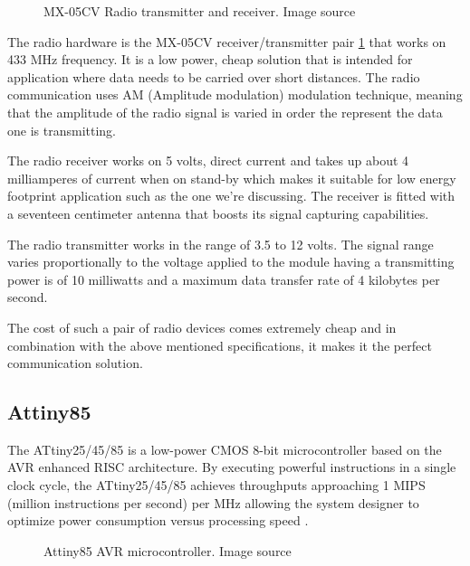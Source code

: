 \begin{figure}[h!]
    \label{fig:rf_tx_rx}
    \centerline{}
    \caption[MX-05CV Radio transmitter and receiver]{MX-05CV Radio transmitter and receiver. Image source
                                                     \cite{website:rf_tx_rx_img}}
    \label{fig:rf_tx_rx}
\end{figure}

\qquad The radio hardware is the MX-05CV receiver/transmitter pair \ref{fig:rf_tx_rx} that works on 433 MHz
frequency. It is a low power, cheap solution that is intended for application where data needs to be carried
over short distances. The radio communication uses AM (Amplitude modulation) modulation technique, meaning
that the amplitude of the radio signal is varied in order the represent the data one is transmitting.

\qquad The radio receiver works on 5 volts, direct current and takes up about 4 milliamperes of current when on stand-by
which makes it suitable for low energy footprint application such as the one we're discussing. The receiver is
fitted with a seventeen centimeter antenna that boosts its signal capturing capabilities.

\qquad The radio transmitter works in the range of 3.5 to 12 volts. The signal range  varies proportionally to the
voltage applied to the module having a transmitting power is of 10 milliwatts and a maximum data transfer rate
of 4 kilobytes per second.

The cost of such a pair of radio devices comes extremely cheap and in combination with the above mentioned
specifications, it makes it the perfect communication solution.

\subsection{Attiny85}
\label{sec:attiny85}

\qquad The ATtiny25/45/85 is a low-power CMOS 8-bit microcontroller based on the AVR enhanced RISC architecture. By
executing powerful instructions in a single clock cycle, the ATtiny25/45/85 achieves throughputs approaching 1
MIPS (million instructions per second) per MHz allowing the system designer to optimize power consumption
versus processing speed
\cite{datasheet:attiny85}.

\begin{figure}[h!]
    \label{fig:attiny85}
    \centerline{}
    \caption[Attiny85 AVR microcontroller]{Attiny85 AVR microcontroller. Image source
                                           \cite{website:attiny85pic}}
    \label{fig:attiny85}
\end{figure}


